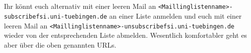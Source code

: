 \fi
\\\\ 
Ihr könnt euch alternativ mit einer leeren Mail an \texttt{<Maillinglistenname>-subscribe\At fsi.uni-tuebingen.de} an einer Liste anmelden und euch mit einer leeren Mail an \texttt{<Maillinglistenname>-unsubscribe\At fsi.uni-tuebingen.de} wieder von der entsprechenden Liste abmelden. Wesentlich komfortabler geht es aber über die oben genannten URLs.

